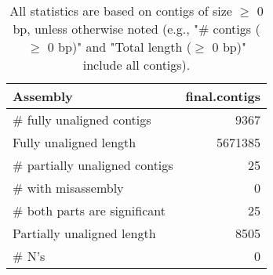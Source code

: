 \documentclass[12pt,a4paper]{article}
\begin{document}
\begin{table}[ht]
\begin{center}
\caption{All statistics are based on contigs of size $\geq$ 0 bp, unless otherwise noted (e.g., "\# contigs ($\geq$ 0 bp)" and "Total length ($\geq$ 0 bp)" include all contigs).}
\begin{tabular}{|l*{1}{|r}|}
\hline
Assembly & final.contigs \\ \hline
\# fully unaligned contigs & 9367 \\ \hline
Fully unaligned length & 5671385 \\ \hline
\# partially unaligned contigs & 25 \\ \hline
\hspace{5mm}\# with misassembly & 0 \\ \hline
\hspace{5mm}\# both parts are significant & 25 \\ \hline
Partially unaligned length & 8505 \\ \hline
\# N's & 0 \\ \hline
\end{tabular}
\end{center}
\end{table}
\end{document}
